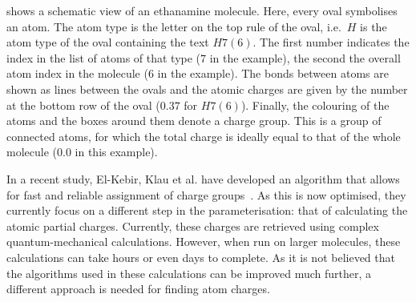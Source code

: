  shows a schematic view of an ethanamine molecule. Here, every oval symbolises an atom. The atom type is the letter on the top rule of the oval, i.e.\ $H$ is the atom type of the oval containing the text $H7 (6)$. The first number indicates the index in the list of atoms of that type ($7$ in the example), the second the overall atom index in the molecule ($6$ in the example). The bonds between atoms are shown as lines between the ovals and the atomic charges are given by the number at the bottom row of the oval ($0.37$ for $H7 (6)$). Finally, the colouring of the atoms and the boxes around them denote a charge group. This is a group of connected atoms, for which the total charge is ideally equal to that of the whole molecule ($0.0$ in this example).

In a recent study, El-Kebir, Klau et al. have developed an algorithm that allows for fast and reliable assignment of charge groups~\cite{canzar2012charge}. As this is now optimised, they currently focus on a different step in the parameterisation: that of calculating the atomic partial charges. Currently, these charges are retrieved using complex quantum-mechanical calculations. However, when run on larger molecules, these calculations can take hours or even days to complete. As it is not believed that the algorithms used in these calculations can be improved much further, a different approach is needed for finding atom charges.


